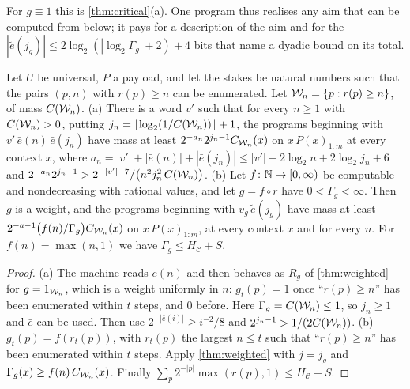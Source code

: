 For $g\equiv1$ this is \cref{thm:critical}(a). One program thus realises any aim that can be computed from
below; it pays for a description of the aim and for the $|\tilde e(j_g)|\le2\log_2(|\log_2\Gamma_g|+2)+4$
bits that name a dyadic bound on its total.
\begin{proposition}\label{prop:aim-cost}
Let $U$ be universal, $P$ a payload, and let the stakes be natural numbers such that the pairs $(p,n)$ with
$r(p)\ge n$ can be enumerated. Let $\mathcal W_n=\{p:r(p)\ge n\}$, of mass $C(\mathcal W_n)$. \textup{(a)} There is a word
$v'$ such that for every $n\ge1$ with $C(\mathcal W_n)>0$, putting $j_n=\lfloor\log_2(1/C(\mathcal W_n))\rfloor+1$, the
programs beginning with $v'\,\bar e(n)\,\bar e(j_n)$ have mass at least $2^{-a_n}2^{j_n-1}C_{\mathcal W_n}(x)$ on
$x\,P(x)_{1:m}$ at every context $x$, where $a_n=|v'|+|\bar e(n)|+|\bar
e(j_n)|\le|v'|+2\log_2n+2\log_2j_n+6$ and $2^{-a_n}2^{j_n-1}>2^{-|v'|-7}/\bigl(n^2j_n^2\,C(\mathcal W_n)\bigr)$.
\textup{(b)} Let $f\colon\mathbb{N}\to[0,\infty)$ be computable and nondecreasing with rational values, and let
$g=f\circ r$ have $0<\Gamma_g<\infty$. Then $g$ is a weight, and the programs beginning with $v_g\,\tilde
e(j_g)$ have mass at least $2^{-a-1}\bigl(f(n)/\Gamma_g\bigr)C_{\mathcal W_n}(x)$ on $x\,P(x)_{1:m}$, at every
context $x$ and for every $n$. For $f(n)=\max(n,1)$ we have $\Gamma_g\le H_{\mathcal C}+S$.
\end{proposition}
\begin{proof}
(a) The machine reads $\bar e(n)$ and then behaves as $R_g$ of \cref{thm:weighted} for $g=1_{\mathcal W_n}$, which
is a weight uniformly in $n$: $g_t(p)=1$ once ``$r(p)\ge n$'' has been enumerated within $t$ steps, and $0$
before. Here $\Gamma_g=C(\mathcal W_n)\le1$, so $j_n\ge1$ and $\bar e$ can be used. Then use $2^{-|\bar e(i)|}\ge
i^{-2}/8$ and $2^{j_n-1}>1/(2C(\mathcal W_n))$. (b) $g_t(p)=f(r_t(p))$, with $r_t(p)$ the largest $n\le t$ such
that ``$r(p)\ge n$'' has been enumerated within $t$ steps. Apply \cref{thm:weighted} with $j=j_g$ and
$\Gamma_g(x)\ge f(n)\,C_{\mathcal W_n}(x)$. Finally $\sum_p2^{-|p|}\max(r(p),1)\le H_{\mathcal C}+S$.
\end{proof}

